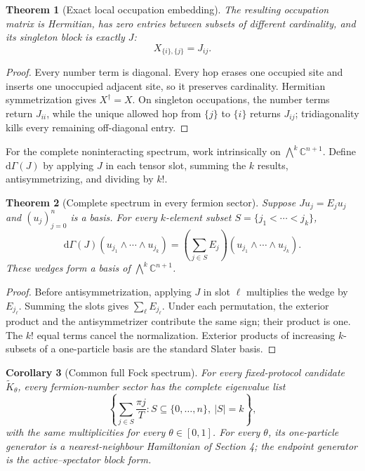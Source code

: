 \documentclass[12pt]{article}
\newtheorem{theorem}{Theorem}[section]
\newtheorem{corollary}[theorem]{Corollary}
\newcommand{\C}{\mathbb C}
\begin{document}
\begin{theorem}[Exact local occupation embedding]
The resulting occupation matrix is Hermitian, has zero entries between
subsets of different cardinality, and its singleton block is exactly
\(J\):
\[
 X_{\{i\},\{j\}}=J_{ij}.
\]
\end{theorem}

\begin{proof}
Every number term is diagonal. Every hop erases one occupied site and
inserts one unoccupied adjacent site, so it preserves cardinality.
Hermitian symmetrization gives \(X^\dagger=X\). On singleton occupations,
the number terms return \(J_{ii}\), while the unique allowed hop from
\(\{j\}\) to \(\{i\}\) returns \(J_{ij}\); tridiagonality kills every
remaining off-diagonal entry.
\end{proof}

For the complete noninteracting spectrum, work intrinsically on
\(\bigwedge^k\C^{n+1}\). Define \(\mathrm d\Gamma(J)\) by applying \(J\)
in each tensor slot, summing the \(k\) results, antisymmetrizing, and
dividing by \(k!\).

\begin{theorem}[Complete spectrum in every fermion sector]
Suppose \(Ju_j=E_ju_j\) and \((u_j)_{j=0}^{n}\) is a basis. For every
\(k\)-element subset \(S=\{j_1<\cdots<j_k\}\),
\[
 \mathrm d\Gamma(J)(u_{j_1}\wedge\cdots\wedge u_{j_k})
 =
 \left(\sum_{j\in S}E_j\right)
 (u_{j_1}\wedge\cdots\wedge u_{j_k}).
\]
These wedges form a basis of \(\bigwedge^k\C^{n+1}\).
\end{theorem}

\begin{proof}
Before antisymmetrization, applying \(J\) in slot \(\ell\) multiplies the
wedge by \(E_{j_\ell}\). Summing the slots gives
\(\sum_{\ell}E_{j_\ell}\). Under each permutation, the exterior product
and the antisymmetrizer contribute the same sign; their product is one.
The \(k!\) equal terms cancel the normalization. Exterior products of
increasing \(k\)-subsets of a one-particle basis are the standard Slater
basis.
\end{proof}

\begin{corollary}[Common full Fock spectrum]
For every fixed-protocol candidate \(\widetilde K_\theta\), every
fermion-number sector has the complete eigenvalue list
\[
 \left\{\sum_{j\in S}\frac{\pi j}{T}:
 S\subseteq\{0,\ldots,n\},\ |S|=k\right\},
\]
with the same multiplicities for every \(\theta\in[0,1]\). For every
\(\theta\), its one-particle generator is a nearest-neighbour Hamiltonian
of Section 4; the endpoint generator is the active--spectator block form.
\end{corollary}
\end{document}
